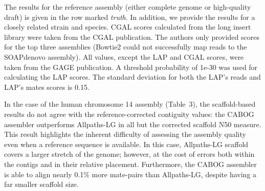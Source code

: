 \begin{landscape}
\begin{table}[tb!]
{The results for the reference
assembly (either complete genome or high-quality draft) is given in the row
marked \emph{truth}.  In addition, we
provide the results for a closely related strain and species.
CGAL scores calculated from the long insert library were taken from the CGAL publication.
The authors only provided scores for the top three assemblies (Bowtie2 could not successfully map reads to the SOAPdenovo assembly).
All values, except the LAP and CGAL scores, were taken from the
GAGE publication. A threshold probability of 1e-30 was used for calculating the LAP scores. The standard deviation for both the LAP's reads and LAP's mates scores is 0.15.}
\label{tab:hg14}
\end{table}

\renewcommand{\baselinestretch}{2}
\small\normalsize
\end{landscape}


In the case of the human chromosome 14 assembly (Table~3), the scaffold-based
results do not agree with the reference-corrected contiguity values: the CABOG assembler outperforms Allpaths-LG in all but the
corrected scaffold N50 measure. This result highlights the inherent
difficulty of assessing the assembly quality even when a reference
sequence is available.  In this case, Allpaths-LG scaffold covers a
larger stretch of the genome; however, at the cost of errors both within the
contigs and in their relative placement.
Furthermore, the CABOG assembler is able to align nearly 0.1\% more mate-pairs than Allpaths-LG, despite having a far smaller scaffold size.

